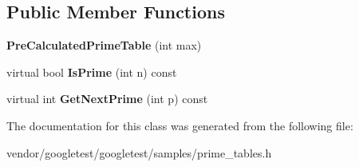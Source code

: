 \subsection*{Public Member Functions}
\begin{DoxyCompactItemize}
\item 
{\bfseries Pre\+Calculated\+Prime\+Table} (int max)\hypertarget{classPreCalculatedPrimeTable_a6bb947504421e31da70d2c71576be350}{}\label{classPreCalculatedPrimeTable_a6bb947504421e31da70d2c71576be350}

\item 
virtual bool {\bfseries Is\+Prime} (int n) const \hypertarget{classPreCalculatedPrimeTable_ae3d0da99f18f4b57d8d63ecebfd65106}{}\label{classPreCalculatedPrimeTable_ae3d0da99f18f4b57d8d63ecebfd65106}

\item 
virtual int {\bfseries Get\+Next\+Prime} (int p) const \hypertarget{classPreCalculatedPrimeTable_a405c77ebe22cd11d7782ea264502ed39}{}\label{classPreCalculatedPrimeTable_a405c77ebe22cd11d7782ea264502ed39}

\end{DoxyCompactItemize}


The documentation for this class was generated from the following file\+:\begin{DoxyCompactItemize}
\item 
vendor/googletest/googletest/samples/prime\+\_\+tables.\+h\end{DoxyCompactItemize}
